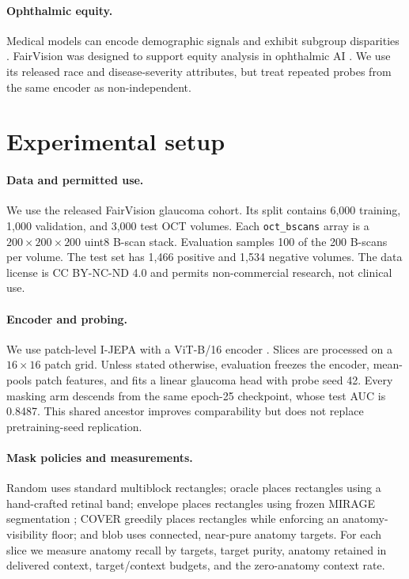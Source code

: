 \documentclass{article}
\begin{document}
\paragraph{Ophthalmic equity.}
Medical models can encode demographic signals and exhibit subgroup disparities
\citep{gichoya2022race,jin2024fairmedfm}. FairVision was designed to support
equity analysis in ophthalmic AI \citep{luo2024fairvision}. We use its released
race and disease-severity attributes, but treat repeated probes from the same
encoder as non-independent.

\section{Experimental setup}

\paragraph{Data and permitted use.}
We use the released FairVision glaucoma cohort. Its split contains 6,000
training, 1,000 validation, and 3,000 test OCT volumes. Each
\texttt{oct\_bscans} array is a
$200\times200\times200$ uint8 B-scan stack. Evaluation samples 100 of the 200
B-scans per volume. The test set has 1,466 positive and 1,534 negative volumes.
The data license is CC BY-NC-ND 4.0 and permits non-commercial research, not
clinical use.

\paragraph{Encoder and probing.}
We use patch-level I-JEPA with a ViT-B/16 encoder
\citep{dosovitskiy2021vit}. Slices are processed on a $16\times16$ patch grid.
Unless stated otherwise, evaluation freezes the encoder, mean-pools patch
features, and fits a linear glaucoma head with probe seed 42. Every masking arm
descends from the same epoch-25 checkpoint, whose test AUC is 0.8487. This
shared ancestor improves comparability but does not replace pretraining-seed
replication.

\paragraph{Mask policies and measurements.}
Random uses standard multiblock rectangles; oracle places rectangles using a
hand-crafted retinal band; envelope places rectangles using frozen MIRAGE
segmentation \citep{morano2025mirage}; COVER greedily places rectangles while
enforcing an anatomy-visibility floor; and blob uses connected, near-pure
anatomy targets. For each slice we measure anatomy recall by targets, target
purity, anatomy retained in delivered context, target/context budgets, and the
zero-anatomy context rate.
\end{document}
